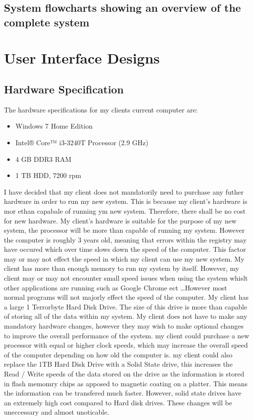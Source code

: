 \begin{itemize}
\subsection{System flowcharts showing an overview of the complete system}


\section{User Interface Designs}

\subsection{Hardware Specification}
	
\begin{flushleft}
The hardware specifications for my clients current computer are: \par

\begin{itemize}
\item Windows 7 Home Edition
\item Intel® Core™ i3-3240T Processor (2.9 GHz)
\item 4 GB DDR3 RAM
\item 1 TB HDD, 7200 rpm
\end{itemize}

I have decided that my client does not mandatorily need to purchase any futher hardware in order to run my new system. This is because my client's hardware is mor ethan capabale of running ym new system. Therefore, there shall be no cost for new hardware. My client's hardware is suitable for the purpose of my new system, the processor will be more than capable of running my system. However the computer is roughly 3 years old, meaning that errors within the registry may have occured which over time slows down the speed of the computer. This factor may or may not effect the speed in which my client can use my new system. My client has more than enough memory to run my system by itself. However, my client may or may not encounter small speed issues when using the system whislt other applications are running such as Google Chrome ect \ldots However most normal programs will not majorly effect the speed of the computer.  My client has a large 1 Terrorbyte Hard Disk Drive. The size of this drive is more than capable of storing all of the data within my system. My client does not have to make any mandatory hardware changes, however they may wish to make optional changes to improve the overall performance of the system. my client could purchase a new processor with equal or higher clock speeds, which may increase the overall speed of the computer depending on how old the computer is.  my client could also replace the 1TB Hard Disk Drive with a Solid State drive, this increases the Read / Write speeds of the data stored on the drive as the information is stored in flash memomry chips as apposed to magnetic coating on a platter. This means the information can be transfered much faster. However, solid state drives have an extremely high cost compared to Hard disk drives. These changes will be uneccessary and almost unoticable.


\end{flushleft}
\end{itemize}
